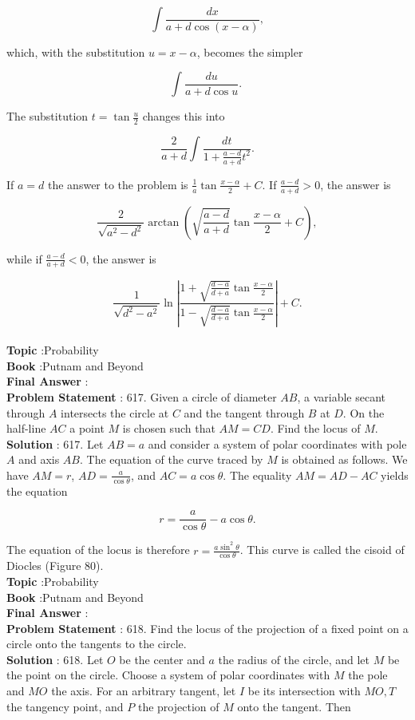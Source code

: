 \documentclass[10pt]{article}
\begin{document}
$$
\int \frac{d x}{a+d \cos (x-\alpha)},
$$

which, with the substitution $u=x-\alpha$, becomes the simpler

$$
\int \frac{d u}{a+d \cos u} \text {. }
$$

The substitution $t=\tan \frac{u}{2}$ changes this into

$$
\frac{2}{a+d} \int \frac{d t}{1+\frac{a-d}{a+d} t^{2}} .
$$

If $a=d$ the answer to the problem is $\frac{1}{a} \tan \frac{x-\alpha}{2}+C$. If $\frac{a-d}{a+d}>0$, the answer is

$$
\frac{2}{\sqrt{a^{2}-d^{2}}} \arctan \left(\sqrt{\frac{a-d}{a+d}} \tan \frac{x-\alpha}{2}+C\right),
$$

while if $\frac{a-d}{a+d}<0$, the answer is

$$
\frac{1}{\sqrt{d^{2}-a^{2}}} \ln \left|\frac{1+\sqrt{\frac{d-a}{d+a}} \tan \frac{x-\alpha}{2}}{1-\sqrt{\frac{d-a}{d+a}} \tan \frac{x-\alpha}{2}}\right|+C .
$$
\\
\textbf{Topic} :Probability\\
\textbf{Book} :Putnam and Beyond\\
\textbf{Final Answer} :\\


\textbf{Problem Statement} :
617. Given a circle of diameter $A B$, a variable secant through $A$ intersects the circle at $C$ and the tangent through $B$ at $D$. On the half-line $A C$ a point $M$ is chosen such that $A M=C D$. Find the locus of $M$. 
\\
\textbf{Solution} :
617. Let $A B=a$ and consider a system of polar coordinates with pole $A$ and axis $A B$. The equation of the curve traced by $M$ is obtained as follows. We have $A M=r$, $A D=\frac{a}{\cos \theta}$, and $A C=a \cos \theta$. The equality $A M=A D-A C$ yields the equation

$$
r=\frac{a}{\cos \theta}-a \cos \theta .
$$

The equation of the locus is therefore $r=\frac{a \sin ^{2} \theta}{\cos \theta}$. This curve is called the cisoid of Diocles (Figure 80).
\\
\textbf{Topic} :Probability\\
\textbf{Book} :Putnam and Beyond\\
\textbf{Final Answer} :\\


\textbf{Problem Statement} :
618. Find the locus of the projection of a fixed point on a circle onto the tangents to the circle.
\\
\textbf{Solution} :
618. Let $O$ be the center and $a$ the radius of the circle, and let $M$ be the point on the circle. Choose a system of polar coordinates with $M$ the pole and $M O$ the axis. For an arbitrary tangent, let $I$ be its intersection with $M O, T$ the tangency point, and $P$ the projection of $M$ onto the tangent. Then
\end{document}
